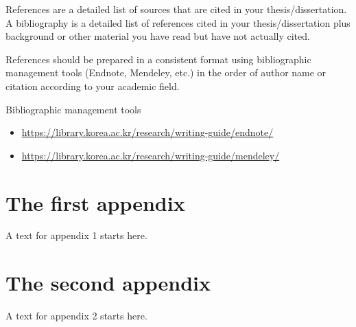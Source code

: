 \documentclass{report}
\begin{document}
\vspace{1cm}

\normalsize
References are a detailed list of sources that are cited in your thesis/dissertation. A bibliography is a detailed list of references cited in your thesis/dissertation plus background or other material you have read but have not actually cited.

References should be prepared in a consistent format using bibliographic management tools (Endnote, Mendeley, etc.) in the order of author name or citation according to your academic field.


Bibliographic management tools
\begin{itemize}
\item\url{https://library.korea.ac.kr/research/writing-guide/endnote/}
\item\url{https://library.korea.ac.kr/research/writing-guide/mendeley/}
\end{itemize}

\newpage
\appendix
{}
\chapter{The first  appendix}
A text for appendix 1 starts here.

\newpage
\chapter{The second appendix}
A text for appendix 2 starts here.

\newpage
{}
\printindex
\end{document}
